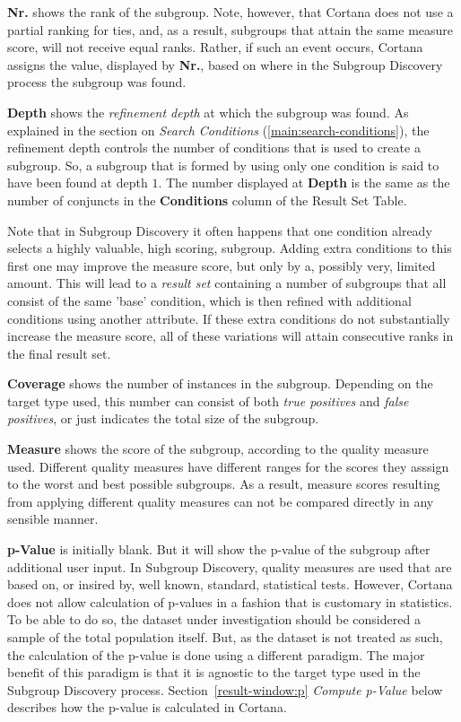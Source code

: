 \documentclass{article}
\begin{document}
\textbf{Nr.} shows the rank of the subgroup.
Note, however, that Cortana does not use a partial ranking for ties, and, as a result, subgroups that attain the same measure score, will not receive equal ranks.
Rather, if such an event occurs, Cortana assigns the value, displayed by \textbf{Nr.}, based on where in the Subgroup Discovery process the subgroup was found.

\textbf{Depth} shows the \emph{refinement depth} at which the subgroup was found.
As explained in the section on \emph{Search Conditions} (\ref{main:search-conditions}), the refinement depth controls the number of conditions that is used to create a subgroup.
So, a subgroup that is formed by using only one condition is said to have been found at depth $1$.
The number displayed at \textbf{Depth} is the same as the number of conjuncts in the \textbf{Conditions} column of the Result Set Table.

Note that in Subgroup Discovery it often happens that one condition already selects a highly valuable, high scoring, subgroup.
Adding extra conditions to this first one may improve the measure score, but only by a, possibly very, limited amount.
This will lead to a \emph{result set} containing a number of subgroups that all consist of the same 'base' condition, which is then refined with additional conditions using another attribute.
If these extra conditions do not substantially increase the measure score, all of these variations will attain consecutive ranks in the final result set.

\textbf{Coverage} shows the number of instances in the subgroup.
Depending on the target type used, this number can consist of both \emph{true positives} and \emph{false positives}, or just indicates the total size of the subgroup.

\textbf{Measure} shows the score of the subgroup, according to the quality measure used.
Different quality measures have different ranges for the scores they asssign to the worst and best possible subgroups.
As a result, measure scores resulting from applying different quality measures can not be compared directly in any sensible manner.

\textbf{p-Value} is initially blank.
But it will show the p-value of the subgroup after additional user input.
In Subgroup Discovery, quality measures are used that are based on, or insired by, well known, standard, statistical tests.
However, Cortana does not allow calculation of p-values in a fashion that is customary in statistics.
To be able to do so, the dataset under investigation should be considered a sample of the total population itself.
But, as the dataset is not treated as such, the calculation of the p-value is done using a different paradigm.
The major benefit of this paradigm is that it is agnostic to the target type used in the Subgroup Discovery process.
Section~\ref{result-window:p} \emph{Compute p-Value} below describes how the p-value is calculated in Cortana.
\end{document}
